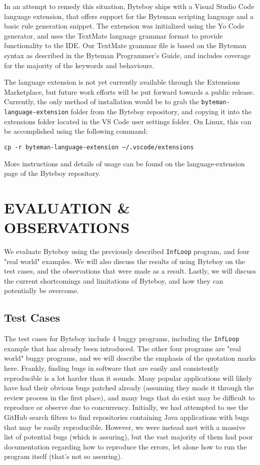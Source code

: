 \documentclass[letterpaper,twocolumn,10pt]{article}
\begin{document}
In an attempt to remedy this situation, Byteboy ships with a Visual Studio Code language extension, that offers support for the Byteman scripting language and a basic rule generation snippet. The extension was initialized using the Yo Code generator\cite{yocode}, and uses the TextMate language grammar format\cite{textmate} to provide functionality to the IDE. Our TextMate grammar file is based on the Byteman syntax as described in the Byteman Programmer's Guide\cite{bytemanguide}, and includes coverage for the majority of the keywords and behaviours.

The language extension is not yet currently available through the Extensions Marketplace, but future work efforts will be put forward towards a public release. Currently, the only method of installation would be to grab the {\tt byteman-language-extension} folder from the Byteboy repository, and copying it into the extensions folder located in the VS Code user settings folder. On Linux, this can be accomplished using the following command: 
\begin{center}
{\tt cp -r byteman-language-extension \textasciitilde/.vscode/extensions}
\end{center}
More instructions and details of usage can be found on the language-extension page of the Byteboy repository\cite{bytemanextension}.

\section{EVALUATION \& OBSERVATIONS}

We evaluate Byteboy using the previously described {\tt InfLoop} program, and four "real world" examples. We will also discuss the results of using Byteboy on the test cases, and the observations that were made as a result. Lastly, we will discuss the current shortcomings and limitations of Byteboy, and how they can potentially be overcome.

\subsection{Test Cases}

The test cases for Byteboy include 4 buggy programs, including the {\tt InfLoop} example that has already been introduced. The other four programs are "real world" buggy programs, and we will describe the emphasis of the quotation marks here. Frankly, finding bugs in software that are easily and consistently reproducible is a lot harder than it sounds. Many popular applications will likely have had their obvious bugs patched already (assuming they made it through the review process in the first place), and many bugs that do exist may be difficult to reproduce or observe due to concurrency. Initially, we had attempted to use the GitHub search filters to find repositories containing Java applications with bugs that may be easily reproducible. However, we were instead met with a massive list of potential bugs (which is assuring), but the vast majority of them had poor documentation regarding how to reproduce the errors, let alone how to run the program itself (that's not so assuring). 
\end{document}
